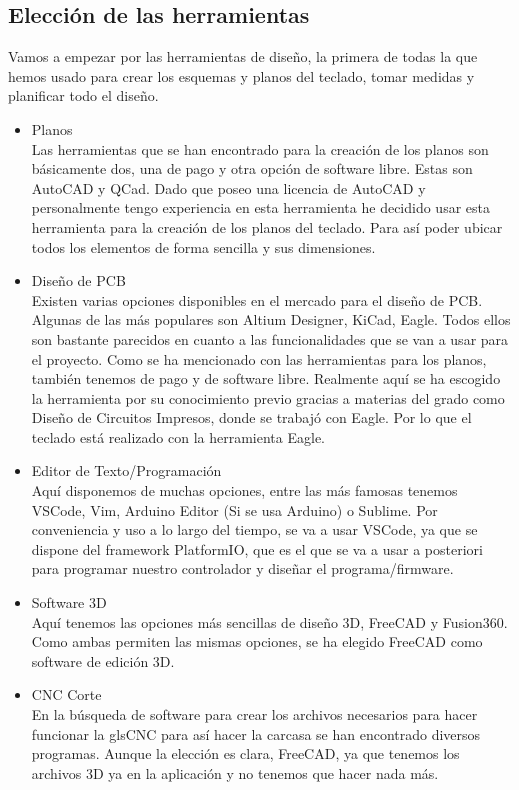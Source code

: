 \subsection{Elección de las herramientas} \label{Herramientas}
Vamos a empezar por las herramientas de diseño, la primera de todas la que hemos usado para crear los esquemas y planos del teclado, tomar medidas y planificar todo el diseño.

\begin{itemize}    
    \item Planos \\
    Las herramientas que se han encontrado para la creación de los planos son básicamente dos, una de pago y otra opción de software libre. Estas son AutoCAD y QCad. Dado que poseo una licencia de AutoCAD y personalmente tengo experiencia en esta herramienta he decidido usar esta herramienta para la creación de los planos del teclado. Para así poder ubicar todos los elementos de forma sencilla y sus dimensiones.
    
    \item Diseño de \gls{PCB} \\
    Existen varias opciones disponibles en el mercado para el diseño de \gls{PCB}. Algunas de las más populares son Altium Designer, KiCad, Eagle. Todos ellos son bastante parecidos en cuanto a las funcionalidades que se van a usar para el proyecto. Como se ha mencionado con las herramientas para los planos, también tenemos de pago y de software libre. Realmente aquí se ha escogido la herramienta por su conocimiento previo gracias a materias del grado como Diseño de Circuitos Impresos, donde se trabajó con Eagle. Por lo que el teclado está realizado con la herramienta Eagle.
    
    \item Editor de Texto/Programación \\
    Aquí disponemos de muchas opciones, entre las más famosas tenemos VSCode, Vim, \gls{Arduino} Editor (Si se usa Arduino) o Sublime. Por conveniencia y uso a lo largo del tiempo, se va a usar VSCode, ya que se dispone del framework \gls{PlatformIO}, que es el que se va a usar a posteriori para programar nuestro controlador y diseñar el programa/firmware.
    
    \item Software 3D \\
    Aquí tenemos las opciones más sencillas de diseño 3D, FreeCAD y Fusion360. Como ambas permiten las mismas opciones, se ha elegido FreeCAD como software de edición 3D.
    
    \item \gls{CNC} Corte \\
    En la búsqueda de software para crear los archivos necesarios para hacer funcionar la gls{CNC} para así hacer la carcasa se han encontrado diversos programas. Aunque la elección es clara, FreeCAD, ya que tenemos los archivos 3D ya en la aplicación y no tenemos que hacer nada más.
    
\end{itemize}
\newpage

